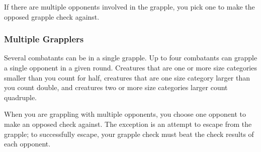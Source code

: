 If there are multiple opponents involved in the grapple, you pick one to make the opposed grapple check against.

\subsubsection{Multiple Grapplers}
Several combatants can be in a single grapple. Up to four combatants can grapple a single opponent in a given round. Creatures that are one or more size categories smaller than you count for half, creatures that are one size category larger than you count double, and creatures two or more size categories larger count quadruple.

When you are grappling with multiple opponents, you choose one opponent to make an opposed check against. The exception is an attempt to escape from the grapple; to successfully escape, your grapple check must beat the check results of each opponent.